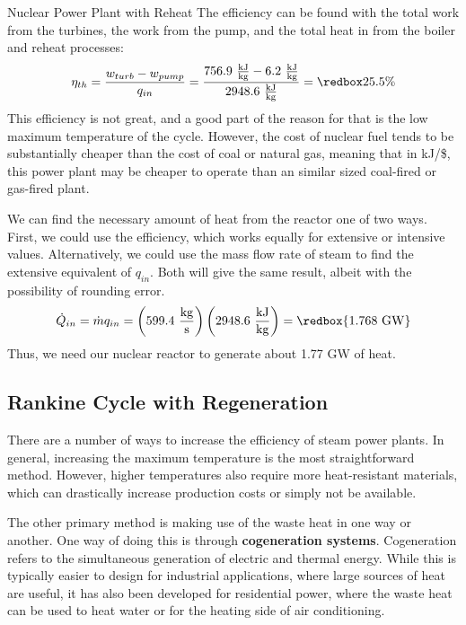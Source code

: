 \begin{example}[label=ex:ch4_supercrit]{Nuclear Power Plant with Reheat}
  The efficiency can be found with the total work from the turbines, the work from the pump, and the total heat in from the boiler and reheat processes:
  \begin{equation*}
    \eta_{th} = \frac{w_{turb} - w_{pump}}{q_{in}} = \frac{756.9\ \frac{\rm kJ}{\rm kg} - 6.2\ \frac{\rm kJ}{\rm kg}}{2948.6\ \frac{\rm kJ}{\rm kg}} = \redbox{25.5\%}
  \end{equation*}
  This efficiency is not great, and a good part of the reason for that is the low maximum temperature of the cycle.  However, the cost of nuclear fuel tends to be substantially cheaper than the cost of coal or natural gas, meaning that in kJ/\$, this power plant may be cheaper to operate than an similar sized coal-fired or gas-fired plant.

  We can find the necessary amount of heat from the reactor one of two ways.  First, we could use the efficiency, which works equally for extensive or intensive values.  Alternatively, we could use the mass flow rate of steam to find the extensive equivalent of $q_{in}$.  Both will give the same result, albeit with the possibility of rounding error.
  \begin{equation*}
    \dot{Q}_{in} = \dot{m} q_{in} = \left(599.4\ \frac{\rm kg}{\rm s}\right) \left(2948.6\ \frac{\rm kJ}{\rm kg}\right) = \redbox{1.768\ {\rm GW}}
  \end{equation*}
  Thus, we need our nuclear reactor to generate about 1.77 GW of heat.
\end{example}


\subsection{Rankine Cycle with Regeneration} \label{sec:ch4_regen}

There are a number of ways to increase the efficiency of steam power plants.  In general, increasing the maximum temperature is the most straightforward method.  However, higher temperatures also require more heat-resistant materials, which can drastically increase production costs or simply not be available.

The other primary method is making use of the waste heat in one way or another.  One way of doing this is through {\bf cogeneration systems}.  Cogeneration refers to the simultaneous generation of electric and thermal energy.  While this is typically easier to design for industrial applications, where large sources of heat are useful, it has also been developed for residential power, where the waste heat can be used to heat water or for the heating side of air conditioning.

